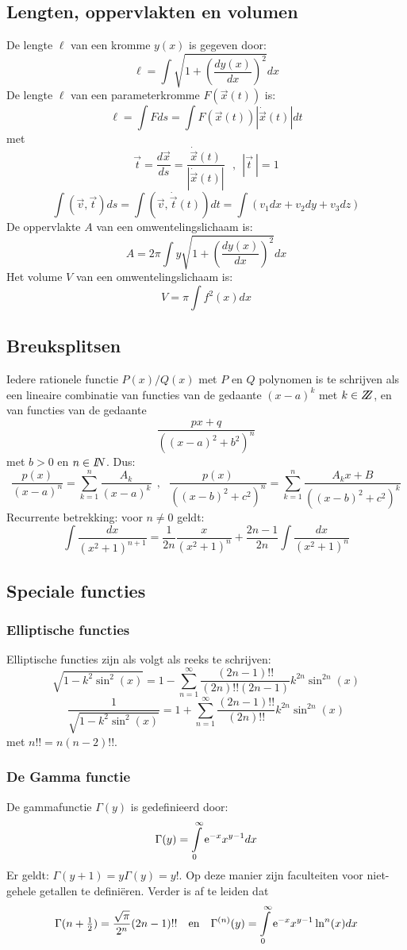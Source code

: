 \subsection{Lengten, oppervlakten en volumen}
De lengte $\ell$ van een kromme $y(x)$ is gegeven door:
\[
\ell=\int\sqrt{1+\left(\frac{dy(x)}{dx}\right)^2}dx
\]
De lengte $\ell$ van een parameterkromme $F(\vec{x}(t))$ is:
\[
\ell=\int Fds=\int F(\vec{x}(t))|\dot{\vec{x}}(t)|dt
\]
met
\[
\vec{t}=\frac{d\vec{x}}{ds}=\frac{\dot{\vec{x}}(t)}{|\dot{\vec{x}}(t)|}~~~,~~|\vec{t}~|=1
\]
\[
\int(\vec{v},\vec{t})ds=\int(\vec{v},\dot{\vec{t}}(t))dt=\int(v_1dx+v_2dy+v_3dz)
\]
De oppervlakte $A$ van een omwentelingslichaam is:
\[
A=2\pi\int y\sqrt{1+\left(\frac{dy(x)}{dx}\right)^2}dx
\]
Het volume $V$ van een omwentelingslichaam is:
\[
V=\pi\int f^2(x)dx
\]

\subsection{Breuksplitsen}
\label{sec:breuksplits}
Iedere rationele functie $P(x)/Q(x)$ met $P$ en $Q$ polynomen is te schrijven
als een lineaire combinatie van functies van de gedaante $(x-a)^k$ met
$k\in Z\hspace{-1ex}Z$, en van functies van de gedaante
\[
\frac{px+q}{((x-a)^2+b^2)^n}
\]
met $b>0$ en $n\in I\hspace{-1mm}N$. Dus:
\[
\frac{p(x)}{(x-a)^n}=\sum_{k=1}^n\frac{A_k}{(x-a)^k}~~,~~~
\frac{p(x)}{((x-b)^2+c^2)^n}=\sum_{k=1}^n \frac{A_kx+B}{((x-b)^2+c^2)^k}
\]
Recurrente betrekking: voor $n\neq0$ geldt:
\[
\int\frac{dx}{(x^2+1)^{n+1}}=\frac{1}{2n}\frac{x}{(x^2+1)^n}+\frac{2n-1}{2n}\int\frac{dx}{(x^2+1)^n}
\]

\subsection{Speciale functies}
\subsubsection{Elliptische functies}
Elliptische functies zijn als volgt als reeks te schrijven:
\[
\sqrt{1-k^2\sin^2(x)}=1-\sum_{n=1}^\infty\frac{(2n-1)!!}{(2n)!!(2n-1)}k^{2n}\sin^{2n}(x)
\]
\[
\frac{1}{\sqrt{1-k^2\sin^2(x)}}=1+\sum_{n=1}^\infty\frac{(2n-1)!!}{(2n)!!}k^{2n}\sin^{2n}(x)
\]
met $n!!=n(n-2)!!$.

\subsubsection{De Gamma functie}
De gammafunctie $\Gamma(y)$ is gedefinieerd door:
\[
\Gamma(y)=\int\limits_0^\infty{\rm e}^{-x}x^{y-1}dx
\]
Er geldt: $\Gamma(y+1)=y\Gamma(y)=y!$. Op deze manier zijn faculteiten voor
niet-gehele getallen te defini\"eren. Verder is af te leiden dat
\[
\Gamma(n+\mbox{$\frac{1}{2}$})=\frac{\sqrt{\pi}}{2^n}(2n-1)!!~~\mbox{ en }~~
\Gamma^{(n)}(y)=\int\limits_0^\infty{\rm e}^{-x}x^{y-1}\ln^n(x)dx
\]


